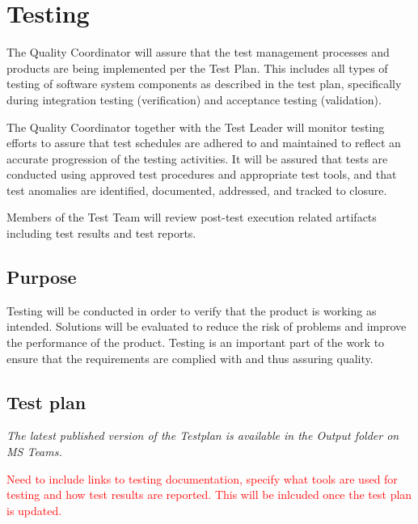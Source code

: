 \section{Testing}

The Quality Coordinator will assure that the test management processes and products are being implemented per the Test Plan. This includes all types of testing of software system components as described in the test plan, specifically during integration testing (verification) and acceptance testing (validation).

The Quality Coordinator together with the Test Leader will monitor testing efforts to assure that test schedules are adhered to and maintained to reflect an accurate progression of the testing activities. It will be assured that tests are conducted using approved test procedures and appropriate test tools, and that test anomalies are identified, documented, addressed, and tracked to closure.

Members of the Test Team will review post-test execution related artifacts including test results and test reports.

\subsection{Purpose}
Testing will be conducted in order to verify that the product is working as intended. Solutions will be evaluated to reduce the risk of problems and improve the performance of the product. Testing is an important part of the work to ensure that the requirements are complied with and thus assuring quality.

\subsection{Test plan}
\emph{The latest published version of the Testplan is available in the Output folder on MS Teams.}

\bigskip
\noindent \textcolor{red}{Need to include links to testing documentation, specify what tools are used for testing and how test results are reported. This will be inlcuded once the test plan is updated.}



